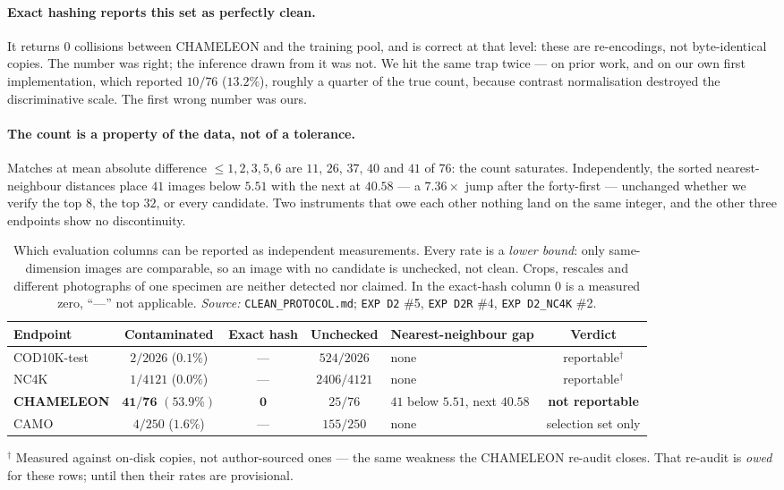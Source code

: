 \documentclass{article} %
\begin{document}
\paragraph{Exact hashing reports this set as perfectly clean.} It returns $0$ collisions between
CHAMELEON and the training pool, and is correct at that level: these are re-encodings, not
byte-identical copies. The number was right; the inference drawn from it was not. We hit the same trap
twice --- on prior work, and on our own first implementation, which reported $10/76$ ($13.2\%$),
roughly a quarter of the true count, because contrast normalisation destroyed the discriminative
scale. The first wrong number was ours.

\paragraph{The count is a property of the data, not of a tolerance.} Matches at mean absolute
difference $\leq 1,2,3,5,6$ are $11$, $26$, $37$, $40$ and $41$ of $76$: the count saturates.
Independently, the sorted nearest-neighbour distances place $41$ images below $5.51$ with the next at
$40.58$ --- a $7.36\times$ jump after the forty-first --- unchanged whether we verify the top $8$, the
top $32$, or every candidate. Two instruments that owe each other nothing land on the same integer,
and the other three endpoints show no discontinuity.

\begin{table}[t]
\caption{Which evaluation columns can be reported as independent measurements. Every rate is a
\emph{lower bound}: only same-dimension images are comparable, so an image with no candidate is
unchecked, not clean. Crops, rescales and different photographs of one specimen are neither detected
nor claimed. In the exact-hash column $0$ is a measured zero, ``---'' not applicable.
\emph{Source:} \texttt{CLEAN\_PROTOCOL.md}; \texttt{EXP D2} \#5, \texttt{EXP D2R} \#4,
\texttt{EXP D2\_NC4K} \#2.}
\label{tab:contamination}
\begin{center}
\small
\begin{tabular}{lccclc}
\toprule
Endpoint & Contaminated & Exact hash & Unchecked & Nearest-neighbour gap & Verdict \\
\midrule
COD10K-test & $2/2026$ \; ($0.1\%$) & --- & $524/2026$ & none & reportable$^\dagger$ \\
NC4K & $1/4121$ \; ($0.0\%$) & --- & $2406/4121$ & none & reportable$^\dagger$ \\
\textbf{CHAMELEON} & $\mathbf{41/76}$ \; $\mathbf{(53.9\%)}$ & $\mathbf{0}$ & $25/76$ & $41$ below $5.51$, next $40.58$ & \textbf{not reportable} \\
CAMO & $4/250$ \; ($1.6\%$) & --- & $155/250$ & none & selection set only \\
\bottomrule
\end{tabular}
\end{center}
\footnotesize $^\dagger$ Measured against on-disk copies, not author-sourced ones --- the same weakness
the CHAMELEON re-audit closes. That re-audit is \emph{owed} for these rows; until then their rates are
provisional.
\end{table}
\end{document}
